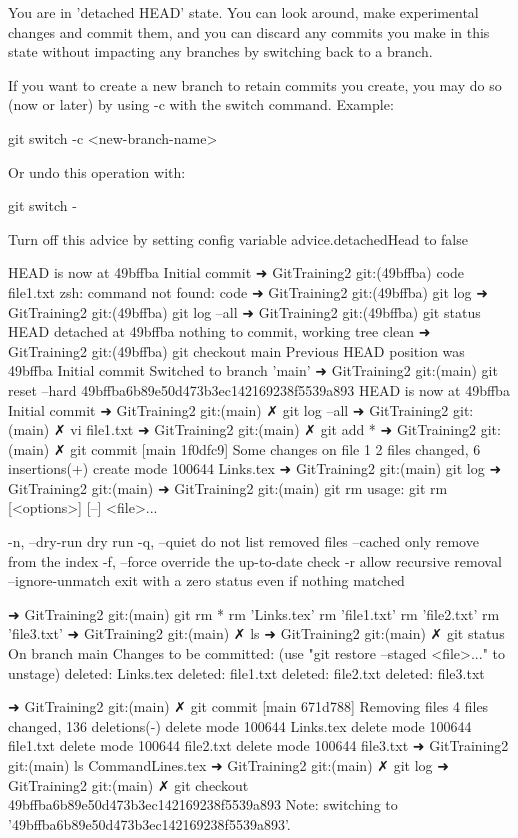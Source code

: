 You are in 'detached HEAD' state. You can look around, make experimental
changes and commit them, and you can discard any commits you make in this
state without impacting any branches by switching back to a branch.

If you want to create a new branch to retain commits you create, you may
do so (now or later) by using -c with the switch command. Example:

  git switch -c <new-branch-name>

Or undo this operation with:

  git switch -

Turn off this advice by setting config variable advice.detachedHead to false

HEAD is now at 49bffba Initial commit
➜  GitTraining2 git:(49bffba) code file1.txt                                    
zsh: command not found: code
➜  GitTraining2 git:(49bffba) git log
➜  GitTraining2 git:(49bffba) git log --all
➜  GitTraining2 git:(49bffba) git status
HEAD detached at 49bffba
nothing to commit, working tree clean
➜  GitTraining2 git:(49bffba) git checkout main 
Previous HEAD position was 49bffba Initial commit
Switched to branch 'main'
➜  GitTraining2 git:(main) git reset --hard 49bffba6b89e50d473b3ec142169238f5539a893
HEAD is now at 49bffba Initial commit
➜  GitTraining2 git:(main) ✗ git log --all    
➜  GitTraining2 git:(main) ✗ vi file1.txt                         
➜  GitTraining2 git:(main) ✗ git add *
➜  GitTraining2 git:(main) ✗ git commit
[main 1f0dfc9] Some changes on file 1
 2 files changed, 6 insertions(+)
 create mode 100644 Links.tex
➜  GitTraining2 git:(main) git log
➜  GitTraining2 git:(main) 
➜  GitTraining2 git:(main) git rm 
usage: git rm [<options>] [--] <file>...

    -n, --dry-run         dry run
    -q, --quiet           do not list removed files
    --cached              only remove from the index
    -f, --force           override the up-to-date check
    -r                    allow recursive removal
    --ignore-unmatch      exit with a zero status even if nothing matched

➜  GitTraining2 git:(main) git rm *
rm 'Links.tex'
rm 'file1.txt'
rm 'file2.txt'
rm 'file3.txt'
➜  GitTraining2 git:(main) ✗ ls
➜  GitTraining2 git:(main) ✗ git status
On branch main
Changes to be committed:
  (use "git restore --staged <file>..." to unstage)
	deleted:    Links.tex
	deleted:    file1.txt
	deleted:    file2.txt
	deleted:    file3.txt

➜  GitTraining2 git:(main) ✗ git commit
[main 671d788] Removing files
 4 files changed, 136 deletions(-)
 delete mode 100644 Links.tex
 delete mode 100644 file1.txt
 delete mode 100644 file2.txt
 delete mode 100644 file3.txt
➜  GitTraining2 git:(main) ls
CommandLines.tex
➜  GitTraining2 git:(main) ✗ git log
➜  GitTraining2 git:(main) ✗ git checkout 49bffba6b89e50d473b3ec142169238f5539a893
Note: switching to '49bffba6b89e50d473b3ec142169238f5539a893'.

